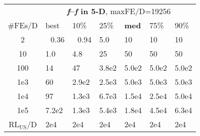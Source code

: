 \begin{tabular}{c|llllll}
 & \multicolumn{6}{|c}{\textbf{\textit{f}\raisebox{-0.35ex}{1}--\textit{f}\raisebox{-0.35ex}{24} in 5-D}, maxFE/D=19256}\\
\#FEs/D & best & 10\% & 25\% & \textbf{med} & 75\% & 90\%\\
2 & ~\,0.36 & ~\,0.94 & \hspace*{1ex}5.0 & 10 & 10 & 10\\
10 & \hspace*{1ex}1.0 & \hspace*{1ex}4.8 & 25 & 50 & 50 & 50\\
100 & 14 & 47 & 3.8e2 & 5.0e2 & 5.0e2 & 5.0e2\\
1e3 & 60 & 2.9e2 & 2.5e3 & 5.0e3 & 5.0e3 & 5.0e3\\
1e4 & 97 & 1.3e3 & 6.7e3 & 1.5e4 & 2.5e4 & 5.0e4\\
1e5 & 7.2e2 & 1.3e3 & 5.4e3 & 1.8e4 & 4.5e4 & 6.3e4\\
$\text{RL}_{\text{US}}$/D & 2e4 & 2e4 & 2e4 & 2e4 & 2e4 & 2e4
\end{tabular}
